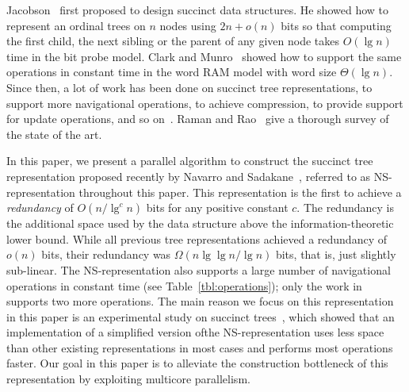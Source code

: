 Jacobson~\cite{j1989} first proposed to design succinct data structures.
He showed how to represent an ordinal trees on $n$ nodes using $2n+o(n)$ bits so
that computing the first child, the next sibling or the parent of any given node
takes $O(\lg n)$ time in the bit probe model.
Clark and Munro~\cite{cm1996} showed how to support the same operations in
constant time in the word RAM model with word size $\Theta(\lg n)$.
Since then, a lot of work has been done on succinct tree representations, to
support more navigational operations, to achieve compression, to provide support
for update operations, and so
on~\cite{mr1997,bdmr1999,grr2004,jss2007,ly2008,hms2012,fm2014,Navarro:2014:FFS:2620785.2601073}. 
Raman and Rao~\cite{rr2013} give a thorough survey of the state of the art.

In this paper, we present a parallel algorithm to construct the succinct tree
representation proposed recently by Navarro and
Sadakane~\cite{Navarro:2014:FFS:2620785.2601073}, referred to as
NS-representation throughout this paper.
This representation is the first to achieve a {\em redundancy}
of $O(n/\lg^c n)$ bits for any positive constant $c$.
The redundancy is the additional space used by the data structure above the
information-theoretic lower bound.
While all previous tree representations achieved a redundancy of $o(n)$ bits,
their redundancy was $\Omega(n \lg\lg n / \lg n)$ bits, that is, just slightly
sub-linear.
The NS-representation also supports a large number of
navigational operations in constant time (see Table~\ref{tbl:operations}); only
the work in \cite{hms2012,fm2014} supports two more operations.
The main reason we focus on this representation in this paper is an experimental
study on succinct trees~\cite{ACNSalenex10}, which showed that an implementation
of a simplified version ofthe NS-representation uses less space than other
existing representations in most cases and performs most operations faster.
Our goal in this paper is to alleviate the construction bottleneck of this
representation by exploiting multicore parallelism.

